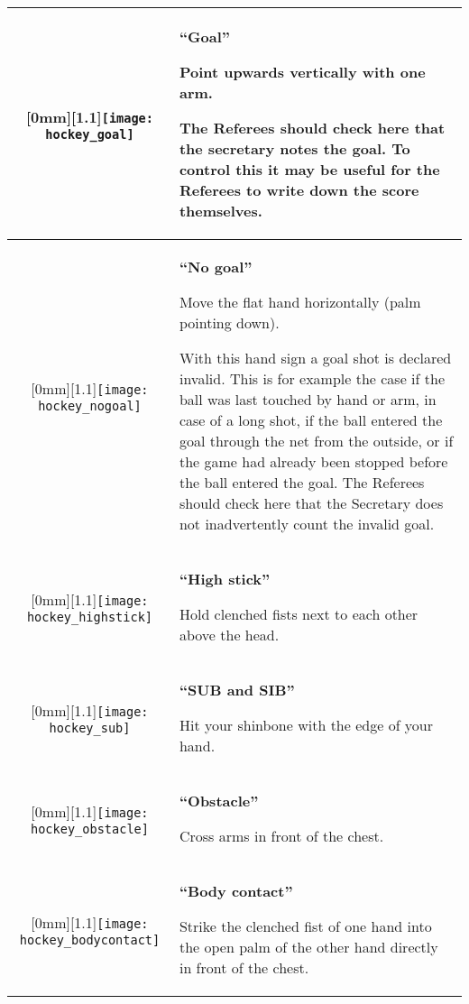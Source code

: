 \begin{longtable}{|c|p{10.8cm}|}
\raisebox{-\height}[0mm][1.1\height]{\texttt{[image: hockey\_goal]}}
&
\textbf{``Goal''}

Point upwards vertically with one arm.

The Referees should check here that the secretary notes the goal.
To control this it may be useful for the Referees to write down the score themselves.\\

\hline %

\raisebox{-\height}[0mm][1.1\height]{\texttt{[image: hockey\_nogoal]}}
&
\textbf{``No goal''}

Move the flat hand horizontally (palm pointing down).

With this hand sign a goal shot is declared invalid.
This is for example the case if the ball was last touched by hand or arm, in case of a long shot, if the ball entered the goal through the net from the outside, or if the game had already been stopped before the ball entered the goal.
The Referees should check here that the Secretary does not inadvertently count the invalid goal.\\

\hline %

\raisebox{-\height}[0mm][1.1\height]{\texttt{[image: hockey\_highstick]}}
&
\textbf{``High stick''}

Hold clenched fists next to each other above the head.\\

\hline %

\raisebox{-\height}[0mm][1.1\height]{\texttt{[image: hockey\_sub]}}
  &
\textbf{``SUB and SIB''}

Hit your shinbone with the edge of your hand.\\

\hline %

\raisebox{-\height}[0mm][1.1\height]{\texttt{[image: hockey\_obstacle]}}
  &
\textbf{``Obstacle''}

Cross arms in front of the chest.\\

\hline %

\raisebox{-\height}[0mm][1.1\height]{\texttt{[image: hockey\_bodycontact]}}
  &
\textbf{``Body contact''}

Strike the clenched fist of one hand into the open palm of the other hand directly in front of the chest.\\


\end{longtable}
